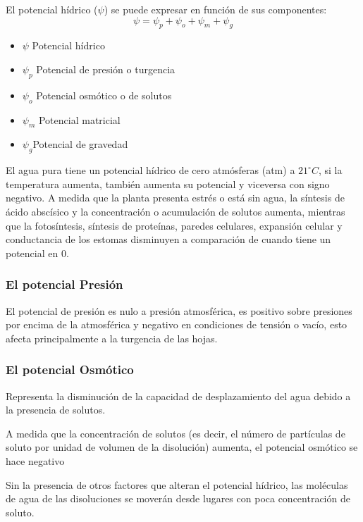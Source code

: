 El potencial hídrico ($\psi $) se puede expresar en función de sus componentes:
\begin{equation}
\psi=\psi_p+\psi_o+\psi_m+\psi_g
\end{equation}

\begin{itemize}
    \item $\psi$ Potencial hídrico
    \item $\psi_p$ Potencial de presión o turgencia
    \item $\psi_o$ Potencial osmótico o de solutos
    \item $\psi_m$ Potencial matricial
    \item $\psi_g$Potencial de gravedad
\end{itemize}

El agua pura tiene un potencial hídrico de cero atmósferas (atm) a $21^{\circ}C$, si la temperatura aumenta, también aumenta su potencial y viceversa con signo negativo.
A medida que la planta presenta estrés o está sin agua, la síntesis de ácido abscísico y la concentración o acumulación de solutos aumenta, mientras que la fotosíntesis, síntesis de proteínas, paredes celulares, expansión celular y conductancia de los estomas disminuyen a comparación de cuando tiene un potencial en 0.

\subsubsection{El potencial Presión}
El potencial de presión es nulo a presión atmosférica, es positivo sobre presiones por encima de la atmosférica y negativo en condiciones de tensión o vacío, esto afecta principalmente a la turgencia de las hojas.

\subsubsection{El potencial Osmótico}

Representa la disminución de la capacidad de desplazamiento del agua debido a la presencia de solutos.

A medida que la concentración de solutos (es decir, el número de partículas de soluto por unidad de volumen de la disolución) aumenta, el potencial osmótico se hace negativo

Sin la presencia de otros factores que alteran el potencial hídrico, las moléculas de agua de las disoluciones se moverán desde lugares con poca concentración de soluto.

